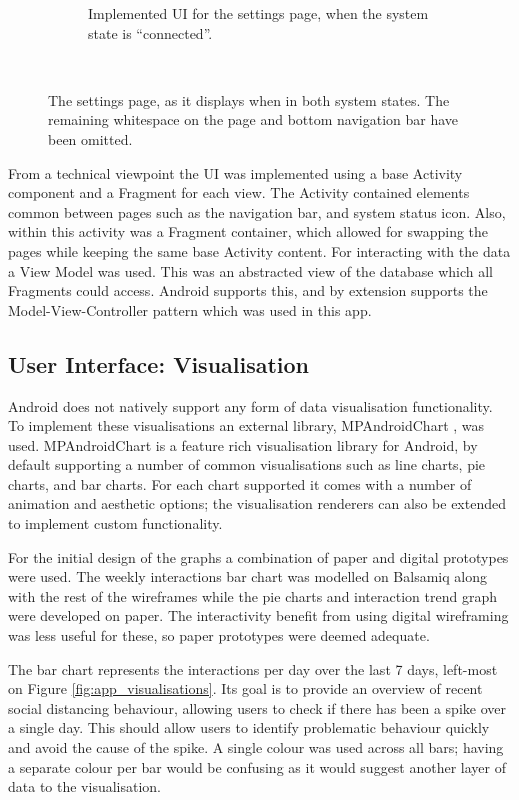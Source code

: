 \documentclass{l4proj}
\begin{document}
\begin{figure}[!htb]
\begin{subfigure}[b]{0.47\textwidth}
        \caption{ Implemented UI for the settings page, when the system state is “connected”. }
        \label{fig:settings_connected}
    \end{subfigure}
    ~
    \caption{ The settings page, as it displays when in both system states. The remaining whitespace on the page and bottom navigation bar have been omitted. }
    \label{fig:settings_page}
\end{figure}

From a technical viewpoint the UI was implemented using a base Activity component and a Fragment for each view. The Activity contained elements common between pages such as the navigation bar, and system status icon. Also, within this activity was a Fragment container, which allowed for swapping the pages while keeping the same base Activity content. For interacting with the data a View Model was used. This was an abstracted view of the database which all Fragments could access. Android supports this, and by extension supports the Model-View-Controller pattern which was used in this app.

\subsection{User Interface: Visualisation}

Android does not natively support any form of data visualisation functionality. To implement these visualisations an external library, MPAndroidChart \citep{jahoda_mpandroidchart_2020}, was used. MPAndroidChart is a feature rich visualisation library for Android, by default supporting a number of common visualisations such as line charts, pie charts, and bar charts. For each chart supported it comes with a number of animation and aesthetic options; the visualisation renderers can also be extended to implement custom functionality.

For the initial design of the graphs a combination of paper and digital prototypes were used. The weekly interactions bar chart was modelled on Balsamiq along with the rest of the wireframes while the pie charts and interaction trend graph were developed on paper. The interactivity benefit from using digital wireframing was less useful for these, so paper prototypes were deemed adequate.

The bar chart represents the interactions per day over the last 7 days, left-most on Figure \ref{fig:app_visualisations}. Its goal is to provide an overview of recent social distancing behaviour, allowing users to check if there has been a spike over a single day. This should allow users to identify problematic behaviour quickly and avoid the cause of the spike. A single colour was used across all bars; having a separate colour per bar would be confusing as it would suggest another layer of data to the visualisation.
\end{document}
